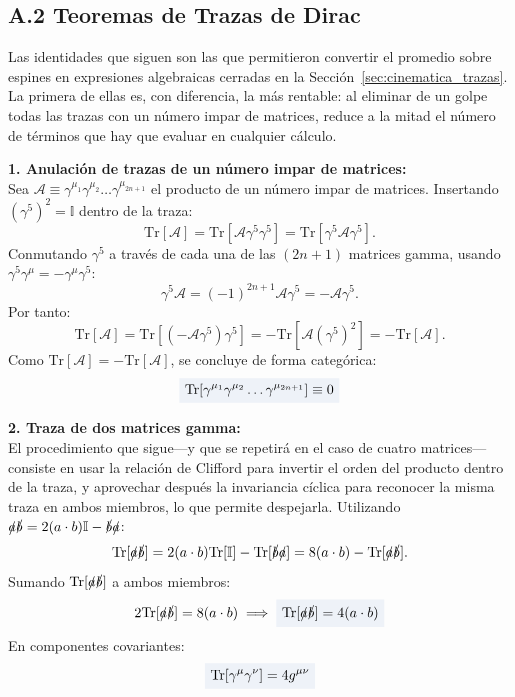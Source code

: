 \documentclass[10pt,a4paper]{article}
\newcommand{\dest}[1]{{\setlength{\fboxsep}{4pt}\colorbox{colordest}{$\displaystyle #1$}}}
\begin{document}
\subsection*{A.2 Teoremas de Trazas de Dirac}
Las identidades que siguen son las que permitieron convertir el promedio sobre espines en expresiones algebraicas cerradas en la Sección~\ref{sec:cinematica_trazas}. La primera de ellas es, con diferencia, la más rentable: al eliminar de un golpe todas las trazas con un número impar de matrices, reduce a la mitad el número de términos que hay que evaluar en cualquier cálculo.

\textbf{1. Anulación de trazas de un número impar de matrices:}\\
Sea $\mathcal{A} \equiv \gamma^{\mu_1} \gamma^{\mu_2} \dots \gamma^{\mu_{2n+1}}$ el producto de un número impar de matrices. Insertando $(\gamma^5)^2 = \mathbb{I}$ dentro de la traza:
\begin{equation}
\text{Tr}[\mathcal{A}] = \text{Tr}[\mathcal{A} \gamma^5 \gamma^5] = \text{Tr}[\gamma^5 \mathcal{A} \gamma^5].
\end{equation}
Conmutando $\gamma^5$ a través de cada una de las $(2n+1)$ matrices gamma, usando $\gamma^5 \gamma^\mu = -\gamma^\mu \gamma^5$:
\begin{equation}
\gamma^5 \mathcal{A} = (-1)^{2n+1} \mathcal{A} \gamma^5 = - \mathcal{A} \gamma^5.
\end{equation}
Por tanto:
\begin{equation}
\text{Tr}[\mathcal{A}] = \text{Tr}[(-\mathcal{A} \gamma^5)\gamma^5] = -\text{Tr}[\mathcal{A} (\gamma^5)^2] = -\text{Tr}[\mathcal{A}].
\end{equation}
Como $\text{Tr}[\mathcal{A}] = -\text{Tr}[\mathcal{A}]$, se concluye de forma categórica:
\begin{equation}
\dest{ \text{Tr}[\gamma^{\mu_1} \gamma^{\mu_2} \dots \gamma^{\mu_{2n+1}}] \equiv 0 }
\end{equation}

\textbf{2. Traza de dos matrices gamma:}\\
El procedimiento que sigue---y que se repetirá en el caso de cuatro matrices---consiste en usar la relación de Clifford para invertir el orden del producto dentro de la traza, y aprovechar después la invariancia cíclica para reconocer la misma traza en ambos miembros, lo que permite despejarla. Utilizando $\slashed{a}\slashed{b} = 2(a\cdot b)\mathbb{I} - \slashed{b}\slashed{a}$:
\begin{equation}
\text{Tr}[\slashed{a}\slashed{b}] = 2(a\cdot b)\text{Tr}[\mathbb{I}] - \text{Tr}[\slashed{b}\slashed{a}] = 8(a\cdot b) - \text{Tr}[\slashed{a}\slashed{b}].
\end{equation}
Sumando $\text{Tr}[\slashed{a}\slashed{b}]$ a ambos miembros:
\begin{equation}
2\text{Tr}[\slashed{a}\slashed{b}] = 8(a\cdot b) \implies \dest{\text{Tr}[\slashed{a}\slashed{b}] = 4 (a \cdot b)}
\end{equation}
En componentes covariantes:
\begin{equation}
\dest{\text{Tr}[\gamma^\mu \gamma^\nu] = 4 g^{\mu\nu}}
\end{equation}
\end{document}
